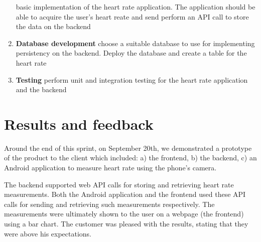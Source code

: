 \begin{enumerate}[1.]
		basic implementation of the heart rate application. The application should be able to acquire
		the user's heart reate and send perform an API call to store the data on the backend
	\item \textbf{Database development}\newline
		choose a suitable database to use for implementing persistency on the backend.
		Deploy the database and create a table for the heart rate
	\item \textbf{Testing}\newline
		perform unit and integration testing for the heart rate application and the backend
\end{enumerate}


\section{Results and feedback}

Around the end of this sprint, on September 20th, we demonstrated a prototype of the product to
the client which included: a) the frontend, b) the backend, c) an Android application to measure
heart rate using the phone's camera.

The backend supported web API calls for storing and retrieving heart rate measurements.
Both the Android application and the frontend used these API calls for sending and retrieving
such measurements respectively.
The measurements were ultimately shown to the user on a webpage (the frontend) using a bar chart.
The customer was pleased with the results, stating that they were above his expectations.

